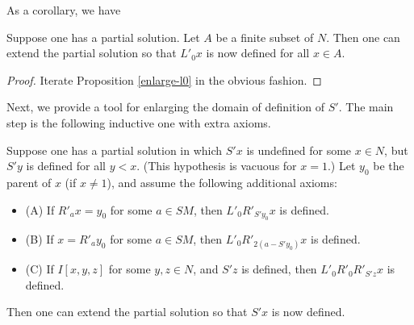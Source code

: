 As a corollary, we have

\begin{proposition}\label{enlarge-l0-many}\leanok  Suppose one has a partial solution.  Let $A$ be a finite subset of $N$.  Then one can extend the partial solution so that $L'_0 x$ is now defined for all $x \in A$.
\end{proposition}

\begin{proof} \leanok {} Iterate Proposition \ref{enlarge-l0} in the obvious fashion.
\end{proof}

Next, we provide a tool for enlarging the domain of definition of $S'$.  The main step is the following inductive one with extra axioms.

\begin{proposition}\label{enlarge-S-induct-axioms}\leanok  Suppose one has a partial solution in which $S'x$ is undefined for some $x \in N$, but $S'y$ is defined for all $y < x$.  (This hypothesis is vacuous for $x=1$.) Let $y_0$ be the parent of $x$ (if $x \neq 1$), and assume the following additional axioms:
  \begin{itemize}
    \item (A) If $R'_a x = y_0$ for some $a \in SM$, then $L'_0 R'_{S' y_0} x$ is defined.
    \item (B) If $x = R'_a y_0$ for some $a \in SM$, then $L'_0 R'_{2(a-S'y_0)} x$ is defined.
    \item (C)  If $I[x,y,z]$ for some $y,z \in N$, and $S'z$ is defined, then $L'_0 R'_0 R'_{S'z} x$ is defined.
    \end{itemize}
  Then one can extend the partial solution so that $S'x$ is now defined.
\end{proposition}

